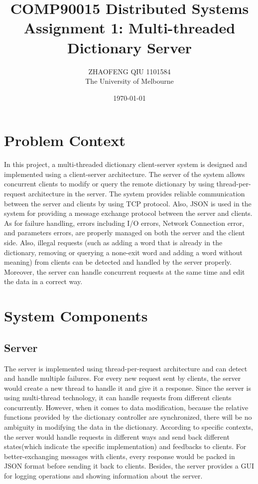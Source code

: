 \documentclass[a4paper]{article}
\title{COMP90015 Distributed Systems \\Assignment 1: Multi-threaded Dictionary Server}
\author{ZHAOFENG QIU 1101584\\The University of Melbourne}
\date{\today}
\begin{document}
\maketitle

\section{Problem Context}
\label{sec:introduction}

In this project, a multi-threaded dictionary client-server system is designed and implemented using a client-server architecture. The server of the system allows concurrent clients to modify or query the remote dictionary by using thread-per-request architecture in the server. The system provides reliable communication between the server and clients by using TCP protocol. Also, JSON is used in the system for providing a message exchange protocol between the server and clients. As for failure handling, errors including I/O errors, Network Connection error, and parameters errors, are properly managed on both the server and the client side. Also, illegal requests (such as adding a word that is already in the dictionary, removing or querying a none-exit word and adding a word without meaning) from clients can be detected and handled by the server properly. Moreover, the server can handle concurrent requests at the same time and edit the data in a correct way.

\section{System Components} %
\label{sec:theory}
\subsection{Server}
The server is implemented using thread-per-request architecture and can detect and handle multiple failures. For every new request sent by clients, the server would create a new thread to handle it and give it a response. Since the server is using multi-thread technology, it can handle requests from different clients concurrently. However, when it comes to data modification, because the relative functions provided by the dictionary controller are synchronized, there will be no ambiguity in modifying the data in the dictionary. According to specific contexts, the server would handle requests in different ways and send back different states(which indicate the specific implementation) and feedbacks to clients. For better-exchanging messages with clients,  every response would be packed in JSON format before sending it back to clients. Besides, the server provides a GUI for logging operations and showing information about the server.
\end{document}
